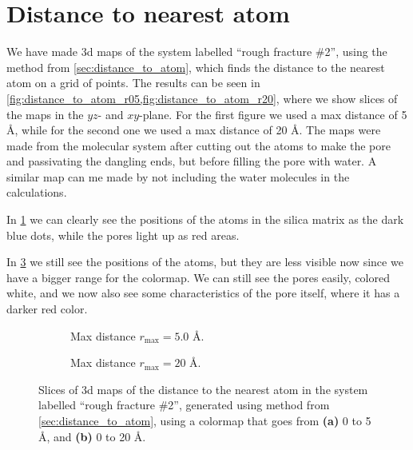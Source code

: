 \section{Distance to nearest atom}
%
We have made 3d maps of the system labelled ``rough fracture \#2'', using the method from \cref{sec:distance_to_atom}, which finds the distance to the nearest atom on a grid of points. The results can be seen in \cref{fig:distance_to_atom_r05,fig:distance_to_atom_r20}, where we show slices of the maps in the $yz$- and $xy$-plane. For the first figure we used a max distance of 5 \AA, while for the second one we used a max distance of 20 \AA. The maps were made from the molecular system after cutting out the atoms to make the pore and passivating the dangling ends, but before filling the pore with water. A similar map can me made by not including the water molecules in the calculations.

In \cref{fig:distance_to_atom_r05} we can clearly see the positions of the atoms in the silica matrix as the dark blue dots, while the pores light up as red areas.

In \cref{fig:distance_to_atom_r20} we still see the positions of the atoms, but they are less visible now since we have a bigger range for the colormap. We can still see the pores easily, colored white, and we now also see some characteristics of the pore itself, where it has a darker red color.%
%
\begin{figure}[htpb]%
    \centering%
    \setlength{\myfigwidth}{0.9\textwidth}%
    \begin{subfigure}[b]{\myfigwidth}%
        \caption{Max distance $r_\text{max}=5.0$ \AA.%
        \label{fig:distance_to_atom_r05}}%
    \end{subfigure}%
    \vspace{10pt}
    \begin{subfigure}[b]{\myfigwidth}%
        \caption{Max distance $r_\text{max}=20$ \AA.%
        \label{fig:distance_to_atom_r20}}%
    \end{subfigure}%
    \caption{%
        Slices of 3d maps of the distance to the nearest atom in the system labelled ``rough fracture \#2'', generated using method from \cref{sec:distance_to_atom}, using a colormap that goes from \textbf{(a)} 0 to 5 \AA, and \textbf{(b)} 0 to 20 \AA.%
    }%
\end{figure}%
